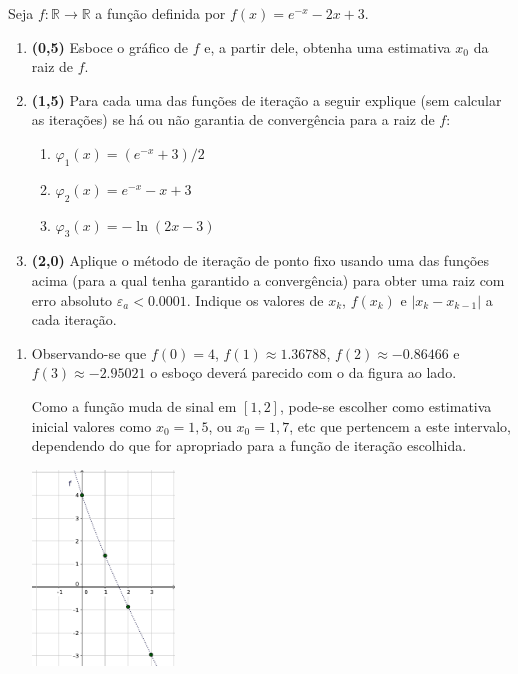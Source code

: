 \documentclass[12pt,a4paper]{article}
\newcommand*\R{\mathbb{R}}
\begin{document}
\begin{ExerciseList}
\Exercise%
Seja $f: \R \to \R$ a função definida por $f(x) = e^{-x} - 2x + 3$.
\begin{enumerate}
\item \textbf{(0,5)} Esboce o gráfico de $f$ e, a partir dele, obtenha uma estimativa $x_0$ da raiz de $f$.
\item \textbf{(1,5)} Para cada uma das funções de iteração a seguir explique (sem calcular as iterações) se há ou não garantia de convergência para a raiz de $f$:
\begin{multicols}{3}
\begin{enumerate}
\item $\varphi_1(x) = (e^{-x}+3)/2$
\item $\varphi_2(x) = e^{-x}-x+3$
\item $\varphi_3(x) = -\ln{(2x-3)}$
\end{enumerate}
\end{multicols}
\item \textbf{(2,0)} Aplique o método de iteração de ponto fixo usando uma das funções acima (para a qual tenha garantido a convergência) para obter uma raiz com erro absoluto $\varepsilon_a < 0.0001$. Indique os valores de $x_k$, $f(x_k)$ e $|x_k - x_{k-1}|$ a cada iteração.
\end{enumerate}
\Answer
\begin{enumerate}
\item
\begin{minipage}[c]{0.50\textwidth}
Observando-se que
$f(0) = 4$,
$f(1) \approx  1.36788$,
$f(2) \approx -0.86466$ e
$f(3) \approx -2.95021$
o esboço deverá parecido com o da figura ao lado.

Como a função muda de sinal em $[1, 2]$, pode-se escolher como estimativa inicial valores como $x_0 = 1,5$, ou $x_0 = 1,7$, etc que pertencem a este intervalo, dependendo do que for apropriado para a função de iteração escolhida.
\end{minipage}
\begin{minipage}[c]{0.25\textwidth}
  \centering
  \includegraphics[width=3.78cm]{img/prova-1-pro-3a-plot.pdf}
\end{minipage}


\end{enumerate}
\end{ExerciseList}
\end{document}

